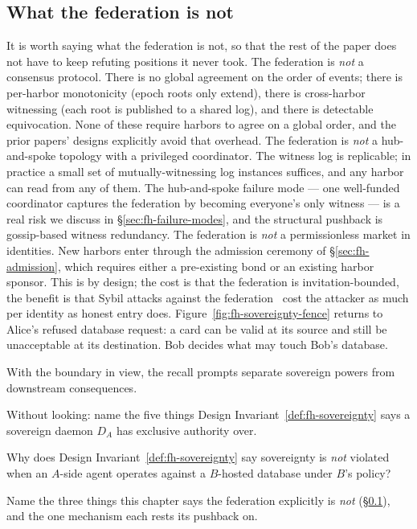 \documentclass[11pt,a4paper]{article}
\theoremstyle{definition}
\theoremstyle{remark}
\begin{document}
\subsection{What the federation is not}\label{sec:fh-not}
It is worth saying what the federation is not, so that the rest of the paper does not have to keep refuting positions it never took.
The federation is \emph{not} a consensus protocol. There is no global agreement on the order of events; there is per-harbor monotonicity (epoch roots only extend), there is cross-harbor witnessing (each root is published to a shared log), and there is detectable equivocation. None of these require harbors to agree on a global order, and the prior papers' designs explicitly avoid that overhead.
The federation is \emph{not} a hub-and-spoke topology with a privileged coordinator. The witness log is replicable; in practice a small set of mutually-witnessing log instances suffices, and any harbor can read from any of them. The hub-and-spoke failure mode --- one well-funded coordinator captures the federation by becoming everyone's only witness --- is a real risk we discuss in \S\ref{sec:fh-failure-modes}, and the structural pushback is gossip-based witness redundancy.
The federation is \emph{not} a permissionless market in identities. New harbors enter through the admission ceremony of \S\ref{sec:fh-admission}, which requires either a pre-existing bond or an existing harbor sponsor. This is by design; the cost is that the federation is invitation-bounded, the benefit is that Sybil attacks against the federation~ cost the attacker as much per identity as honest entry does.
Figure~\ref{fig:fh-sovereignty-fence} returns to Alice's refused database
request: a card can be valid at its source and still be unacceptable at its
destination. Bob decides what may touch Bob's database.

With the boundary in view, the recall prompts separate sovereign powers from downstream consequences.
\begin{pdrecitationbody}
\item Without looking: name the five things Design Invariant~\ref{def:fh-sovereignty} says a sovereign daemon $D_A$ has exclusive authority over.
\item Why does Design Invariant~\ref{def:fh-sovereignty} say sovereignty is \emph{not} violated when an $A$-side agent operates against a $B$-hosted database under $B$'s policy?
\item Name the three things this chapter says the federation explicitly is \emph{not} (\S\ref{sec:fh-not}), and the one mechanism each rests its pushback on.
\end{pdrecitationbody}
\end{document}
